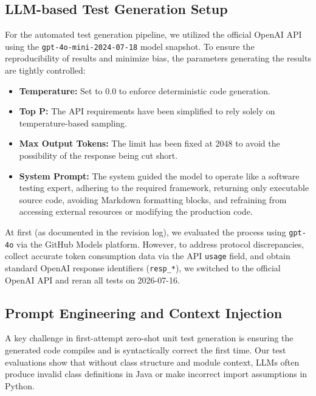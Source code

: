 \documentclass[conference]{IEEEtran}
\begin{document}
\subsection{LLM-based Test Generation Setup}
\label{subsec:llm_setup}

For the automated test generation pipeline, we utilized the official OpenAI API
using the \texttt{gpt-4o-mini-2024-07-18} model snapshot.
To ensure the reproducibility of results and minimize bias, the parameters
generating the results are tightly controlled:
\begin{itemize}
    \item \textbf{Temperature:} Set to 0.0 to enforce deterministic code
    generation.
    \item \textbf{Top P:} The API requirements have been simplified to rely
    solely on temperature-based sampling.
    \item \textbf{Max Output Tokens:} The limit has been fixed at 2048 to avoid
    the possibility of the response being cut short.
    \item \textbf{System Prompt:} The system guided the model to operate like a
    software testing expert, adhering to the required framework, returning only
    executable source code, avoiding Markdown formatting blocks, and refraining
    from accessing external resources or modifying the production code.
\end{itemize}

At first (as documented in the revision log), we evaluated the process using
\texttt{gpt-4o} via the GitHub Models platform.
However, to address protocol discrepancies, collect accurate token consumption
data via the API \texttt{usage} field, and obtain standard OpenAI response
identifiers (\texttt{resp\_*}), we switched to the official OpenAI API and
reran all tests on 2026-07-16.

\subsection{Prompt Engineering and Context Injection}
\label{subsec:prompt_engineering}

A key challenge in first-attempt zero-shot unit test generation is ensuring the
generated code compiles and is syntactically correct the first time.
Our test evaluations show that without class structure and module context, LLMs
often produce invalid class definitions in Java or make incorrect import
assumptions in Python.
\end{document}

